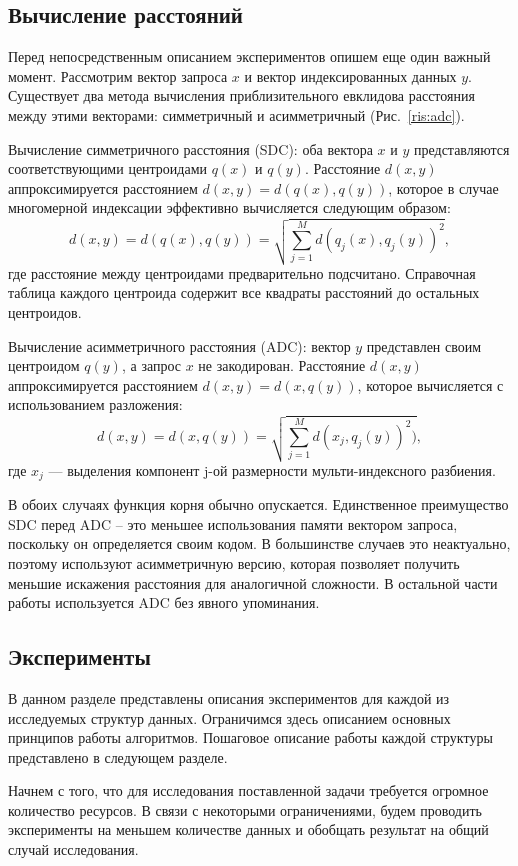 \subsection{Вычисление расстояний}

Перед непосредственным описанием экспериментов опишем еще один важный момент. Рассмотрим вектор запроса $x$ и вектор индексированных данных $y$. Существует два метода вычисления приблизительного евклидова расстояния между этими векторами: симметричный и асимметричный (Рис.~\ref{ris:adc}).

Вычисление симметричного расстояния (SDC): оба вектора $x$ и $y$ представляются соответствующими центроидами $q(x)$ и $q(y)$. Расстояние $d(x, y)$ аппроксимируется расстоянием $d(x, y) = d(q(x), q(y))$, которое в случае многомерной индексации эффективно вычисляется следующим образом:
$$d(x, y) = d(q(x), q(y)) = \sqrt{\sum_{j=1}^M d(q_j(x),q_j(y))^2},$$
где расстояние между центроидами предварительно подсчитано. Справочная таблица каждого центроида содержит все квадраты расстояний до остальных центроидов.

Вычисление асимметричного расстояния (ADC): вектор $y$ представлен своим центроидом $q(y)$, а запрос $x$ не закодирован. Расстояние $d(x, y)$ аппроксимируется расстоянием $d(x, y) = d(x, q (y))$, которое вычисляется с использованием разложения:
$$d(x, y) = d(x, q(y)) = \sqrt{\sum_{j=1}^M d(x_j, q_j(y))^2)},$$
где $x_j$ — выделения компонент j-ой размерности мульти-индексного разбиения.

В обоих случаях функция корня обычно опускается. Единственное преимущество SDC перед ADC -- это меньшее использования памяти вектором запроса, поскольку он определяется своим кодом. В большинстве случаев это неактуально, поэтому используют асимметричную версию, которая позволяет получить меньшие искажения расстояния для аналогичной сложности. В остальной части работы используется ADC без явного упоминания.

\subsection{Эксперименты}

В данном разделе представлены описания экспериментов для каждой из исследуемых структур данных. Ограничимся здесь описанием основных принципов работы алгоритмов. Пошаговое описание работы каждой структуры представлено в следующем разделе.

Начнем с того, что для исследования поставленной задачи требуется огромное количество ресурсов. В связи с некоторыми ограничениями, будем проводить эксперименты на меньшем количестве данных и обобщать результат на общий случай исследования.

